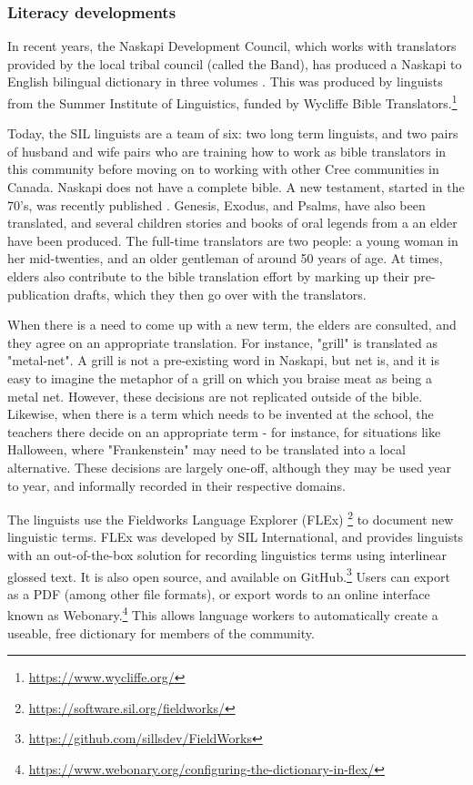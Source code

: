\subsubsection{Literacy developments}
In recent years, the Naskapi Development Council, which works with translators provided by the local tribal council (called the Band), has produced a Naskapi to English bilingual dictionary in three volumes \cite{MacKenzie-and-Jancewicz-1994}. This was produced by linguists from the Summer Institute of Linguistics, funded by Wycliffe Bible Translators.\footnote{\href{https://www.wycliffe.org/}{https://www.wycliffe.org/}}

Today, the SIL linguists are a team of six: two long term linguists, and two pairs of husband and wife pairs who are training how to work as bible translators in this community before moving on to working with other Cree communities in Canada. Naskapi does not have a complete bible. A new testament, started in the 70's, was recently published \cite{naskapi-new-testament}. Genesis, Exodus, and Psalms, have also been translated, and several children stories and books of oral legends from a an elder have been produced. The full-time translators are two people: a young woman in her mid-twenties, and an older gentleman of around 50 years of age. At times, elders also contribute to the bible translation effort by marking up their pre-publication drafts, which they then go over with the translators.

When there is a need to come up with a new term, the elders are consulted, and they agree on an appropriate translation. For instance, "grill" is translated as "metal-net". A grill is not a pre-existing word in Naskapi, but net is, and it is easy to imagine the metaphor of a grill on which you braise meat as being a metal net. However, these decisions are not replicated outside of the bible. Likewise, when there is a term which needs to be invented at the school, the teachers there decide on an appropriate term - for instance, for situations like Halloween, where "Frankenstein" may need to be translated into a local alternative. These decisions are largely one-off, although they may be used year to year, and informally recorded in their respective domains.

The linguists use the Fieldworks Language Explorer (FLEx) \footnote{\href{https://software.sil.org/fieldworks/}{https://software.sil.org/fieldworks/}} to document new linguistic terms. FLEx was developed by SIL International, and provides linguists with an out-of-the-box solution for recording linguistics terms using interlinear glossed text. It is also open source, and available on GitHub.\footnote{\href{https://github.com/sillsdev/FieldWorks}{https://github.com/sillsdev/FieldWorks}} Users can export as a PDF (among other file formats), or export words to an online interface known as Webonary.\footnote{\href{https://www.webonary.org/configuring-the-dictionary-in-flex/}{https://www.webonary.org/configuring-the-dictionary-in-flex/}}
This allows language workers to automatically create a useable, free dictionary for members of the community.

